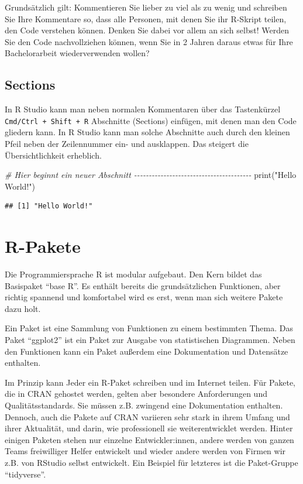 \documentclass[
]{book}
\newenvironment{Shaded}{\begin{snugshade}}{\end{snugshade}}
\newcommand{\CommentTok}[1]{\textcolor[rgb]{0.56,0.35,0.01}{\textit{#1}}}
\newcommand{\FunctionTok}[1]{\textcolor[rgb]{0.00,0.00,0.00}{#1}}
\newcommand{\NormalTok}[1]{#1}
\newcommand{\StringTok}[1]{\textcolor[rgb]{0.31,0.60,0.02}{#1}}
\begin{document}
Grundsätzlich gilt: Kommentieren Sie lieber zu viel als zu wenig und schreiben Sie Ihre Kommentare so, dass alle Personen, mit denen Sie ihr R-Skript teilen, den Code verstehen können. Denken Sie dabei vor allem an sich selbst! Werden Sie den Code nachvollziehen können, wenn Sie in 2 Jahren daraus etwas für Ihre Bachelorarbeit wiederverwenden wollen?

\hypertarget{sections}{%
\subsection{Sections}\label{sections}}

In R Studio kann man neben normalen Kommentaren über das Tastenkürzel \texttt{Cmd/Ctrl\ +\ Shift\ +\ R} Abschnitte (Sections) einfügen, mit denen man den Code gliedern kann. In R Studio kann man solche Abschnitte auch durch den kleinen Pfeil neben der Zeilennummer ein- und ausklappen. Das steigert die Übersichtlichkeit erheblich.

\begin{Shaded}
\begin{Highlighting}[]
\CommentTok{\# Hier beginnt ein neuer Abschnitt {-}{-}{-}{-}{-}{-}{-}{-}{-}{-}{-}{-}{-}{-}{-}{-}{-}{-}{-}{-}{-}{-}{-}{-}{-}{-}{-}{-}{-}{-}{-}{-}{-}{-}{-}{-}{-}{-}{-}{-}}
\FunctionTok{print}\NormalTok{(}\StringTok{"Hello World!"}\NormalTok{)}
\end{Highlighting}
\end{Shaded}

\begin{verbatim}
## [1] "Hello World!"
\end{verbatim}

\hypertarget{r-pakete}{%
\section{R-Pakete}\label{r-pakete}}

Die Programmiersprache R ist modular aufgebaut. Den Kern bildet das Basispaket ``base R''. Es enthält bereits die grundsätzlichen Funktionen, aber richtig spannend und komfortabel wird es erst, wenn man sich weitere Pakete dazu holt.

Ein Paket ist eine Sammlung von Funktionen zu einem bestimmten Thema. Das Paket ``ggplot2'' ist ein Paket zur Ausgabe von statistischen Diagrammen. Neben den Funktionen kann ein Paket außerdem eine Dokumentation und Datensätze enthalten.

Im Prinzip kann Jeder ein R-Paket schreiben und im Internet teilen. Für Pakete, die in CRAN gehostet werden, gelten aber besondere Anforderungen und Qualitätsstandards. Sie müssen z.B. zwingend eine Dokumentation enthalten. Dennoch, auch die Pakete auf CRAN variieren sehr stark in ihrem Umfang und ihrer Aktualität, und darin, wie professionell sie weiterentwicklet werden. Hinter einigen Paketen stehen nur einzelne Entwickler:innen, andere werden von ganzen Teams freiwilliger Helfer entwickelt und wieder andere werden von Firmen wir z.B. von RStudio selbst entwickelt. Ein Beispiel für letzteres ist die Paket-Gruppe ``tidyverse''.
\end{document}
